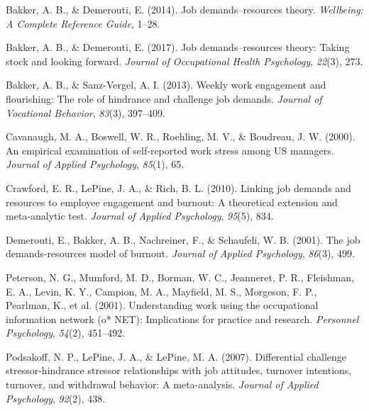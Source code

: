 \documentclass[
  man]{apa6}
\newlength{\cslhangindent}
\newlength{\cslentryspacingunit} %
\newenvironment{CSLReferences}[2] %
 {%
  \setlength{\parindent}{0pt}
  \ifodd #1
  \let\oldpar\par
  \def\par{\hangindent=\cslhangindent\oldpar}
  \fi
  \setlength{\parskip}{#2\cslentryspacingunit}
 }%
 {}
\begin{document}
\hypertarget{refs}{}
\begin{CSLReferences}{1}{0}
\leavevmode{}%
Bakker, A. B., \& Demerouti, E. (2014). Job demands--resources theory. \emph{Wellbeing: A Complete Reference Guide}, 1--28.

\leavevmode{}%
Bakker, A. B., \& Demerouti, E. (2017). Job demands--resources theory: Taking stock and looking forward. \emph{Journal of Occupational Health Psychology}, \emph{22}(3), 273.

\leavevmode{}%
Bakker, A. B., \& Sanz-Vergel, A. I. (2013). Weekly work engagement and flourishing: The role of hindrance and challenge job demands. \emph{Journal of Vocational Behavior}, \emph{83}(3), 397--409.

\leavevmode{}%
Cavanaugh, M. A., Boswell, W. R., Roehling, M. V., \& Boudreau, J. W. (2000). An empirical examination of self-reported work stress among US managers. \emph{Journal of Applied Psychology}, \emph{85}(1), 65.

\leavevmode{}%
Crawford, E. R., LePine, J. A., \& Rich, B. L. (2010). Linking job demands and resources to employee engagement and burnout: A theoretical extension and meta-analytic test. \emph{Journal of Applied Psychology}, \emph{95}(5), 834.

\leavevmode{}%
Demerouti, E., Bakker, A. B., Nachreiner, F., \& Schaufeli, W. B. (2001). The job demands-resources model of burnout. \emph{Journal of Applied Psychology}, \emph{86}(3), 499.

\leavevmode{}%
Peterson, N. G., Mumford, M. D., Borman, W. C., Jeanneret, P. R., Fleishman, E. A., Levin, K. Y., Campion, M. A., Mayfield, M. S., Morgeson, F. P., Pearlman, K., et al. (2001). Understanding work using the occupational information network (o* NET): Implications for practice and research. \emph{Personnel Psychology}, \emph{54}(2), 451--492.

\leavevmode{}%
Podsakoff, N. P., LePine, J. A., \& LePine, M. A. (2007). Differential challenge stressor-hindrance stressor relationships with job attitudes, turnover intentions, turnover, and withdrawal behavior: A meta-analysis. \emph{Journal of Applied Psychology}, \emph{92}(2), 438.


\end{CSLReferences}
\end{document}
